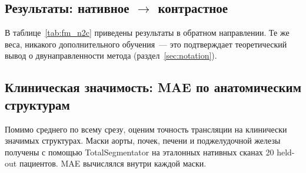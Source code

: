 \subsection{Результаты: нативное $\to$ контрастное}
\label{sec:quant_n2c}

В таблице~\ref{tab:fm_n2c} приведены результаты в обратном направлении. Те же веса, никакого дополнительного обучения~--- это подтверждает теоретический вывод о двунаправленности метода (раздел~\ref{sec:notation}).

\begin{table}[htbp]
\centering
\caption{Флоу матчинг и SMILE (нативное $\to$ контрастное, held-out).}
\label{tab:fm_n2c}
\end{table}

\subsection{Клиническая значимость: MAE по анатомическим структурам}
\label{sec:per_organ}

Помимо среднего по всему срезу, оценим точность трансляции на клинически значимых структурах. Маски аорты, почек, печени и поджелудочной железы получены с помощью TotalSegmentator на эталонных нативных сканах 20 held-out пациентов. MAE вычислялся внутри каждой маски.

